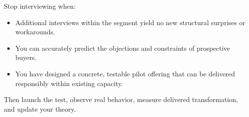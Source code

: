 Stop interviewing when:
\begin{itemize}[leftmargin=1.2em,itemsep=0.2ex]
  \item Additional interviews within the segment yield no new structural surprises or workarounds.
  \item You can accurately predict the objections and constraints of prospective buyers.
  \item You have designed a concrete, testable pilot offering that can be delivered responsibly within existing capacity.
\end{itemize}
Then launch the test, observe real behavior, measure delivered transformation, and update your theory.
